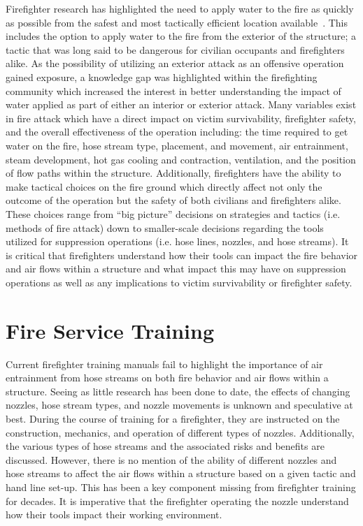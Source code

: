 \documentclass[12pt,oneside]{book}
\begin{document}
Firefighter research has highlighted the need to apply water to the fire as quickly as possible from the safest and most tactically efficient location available~\cite{DHS2008,DHS2010,DHS2011}. This includes the option to apply water to the fire from the exterior of the structure; a tactic that was long said to be dangerous for civilian occupants and firefighters alike. As the possibility of utilizing an exterior attack as an offensive operation gained exposure, a knowledge gap was highlighted within the firefighting community which increased the interest in better understanding the impact of water applied as part of either an interior or exterior attack. Many variables exist in fire attack which have a direct impact on victim survivability, firefighter safety, and the overall effectiveness of the operation including: the time required to get water on the fire, hose stream type, placement, and movement, air entrainment, steam development, hot gas cooling and contraction, ventilation, and the position of flow paths within the structure. Additionally, firefighters have the ability to make tactical choices on the fire ground which directly affect not only the outcome of the operation but the safety of both civilians and firefighters alike. These choices range from ``big picture'' decisions on strategies and tactics (i.e. methods of fire attack) down to smaller-scale decisions regarding the tools utilized for suppression operations (i.e. hose lines, nozzles, and hose streams). It is critical that firefighters understand how their tools can impact the fire behavior and air flows within a structure and what impact this may have on suppression operations as well as any implications to victim survivability or firefighter safety.

\section{Fire Service Training}

Current firefighter training manuals fail to highlight the importance of air entrainment from hose streams on both fire behavior and air flows within a structure. Seeing as little research has been done to date, the effects of changing nozzles, hose stream types, and nozzle movements is unknown and speculative at best. During the course of training for a firefighter, they are instructed on the construction, mechanics, and operation of different types of nozzles. Additionally, the various types of hose streams and the associated risks and benefits are discussed. However, there is no mention of the ability of different nozzles and hose streams to affect the air flows within a structure based on a given tactic and hand line set-up. This has been a key component missing from firefighter training for decades. It is imperative that the firefighter operating the nozzle understand how their tools impact their working environment. 
\end{document}
